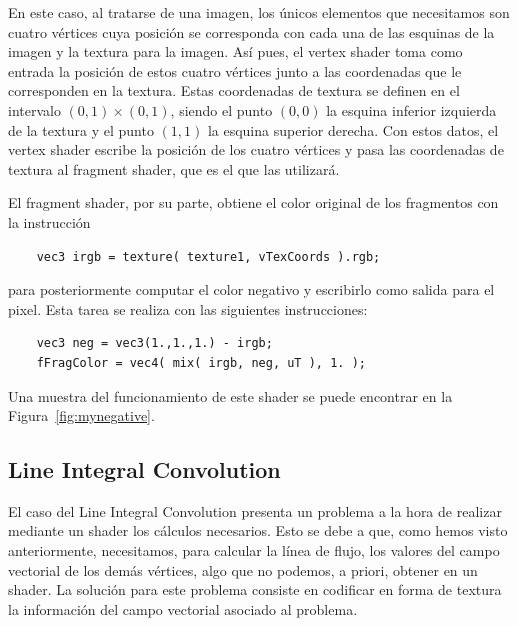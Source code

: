 En este caso, al tratarse de una imagen, los únicos elementos que necesitamos
son cuatro vértices cuya posición se corresponda con cada una de las esquinas de
la imagen y la textura para la imagen. Así pues, el vertex shader toma como
entrada la posición de estos cuatro vértices junto a las coordenadas que le
corresponden en la textura. Estas coordenadas de textura se definen en el
intervalo $(0,1)\times(0,1)$, siendo el punto $(0,0)$ la esquina inferior
izquierda de la textura y el punto $(1,1)$ la esquina superior derecha. Con
estos datos, el vertex shader escribe la posición de los cuatro vértices y pasa
las coordenadas de textura al fragment shader, que es el que las utilizará. 

El fragment shader, por su parte, obtiene el color original de los fragmentos
con la instrucción

\begin{verbatim}
    vec3 irgb = texture( texture1, vTexCoords ).rgb;
\end{verbatim}

para posteriormente computar el color negativo y escribirlo como salida para el
pixel. Esta tarea se realiza con las siguientes instrucciones:

\begin{verbatim}
    vec3 neg = vec3(1.,1.,1.) - irgb;
    fFragColor = vec4( mix( irgb, neg, uT ), 1. );
\end{verbatim}

Una muestra del funcionamiento de este shader se puede encontrar en la
Figura~\ref{fig:mynegative}.

% 

\subsection{Line Integral Convolution}
\label{makereference5.5.8}

El caso del Line Integral Convolution presenta un problema a la hora de realizar
mediante un shader los cálculos necesarios. Esto se debe a que, como hemos visto
anteriormente, necesitamos, para calcular la línea de flujo, los valores del
campo vectorial de los demás vértices, algo que no podemos, a priori, obtener en
un shader. La solución para este problema consiste en codificar en forma de
textura la información del campo vectorial asociado al problema. 

